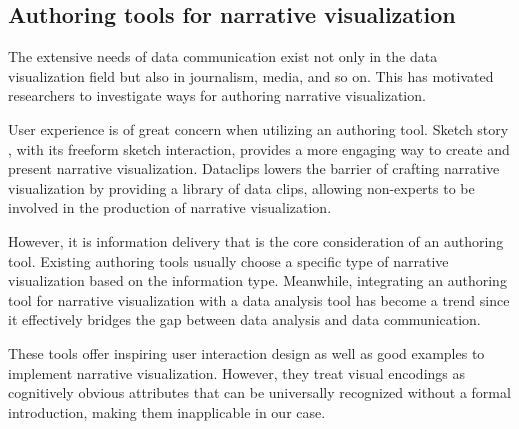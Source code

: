 \documentclass[review,journal]{vgtc}         %
\begin{document}
\subsection{Authoring tools for narrative visualization}
The extensive needs of data communication exist not only in the data visualization field but also in journalism, media, and so on. This has motivated researchers to investigate ways for authoring narrative visualization. \par
User experience is of great concern when utilizing an authoring tool. Sketch story \cite{lee_sketchstory:_2013}, with its freeform sketch interaction, provides a more engaging way to create and present narrative visualization. Dataclips \cite{amini_authoring_2017}lowers the barrier of crafting narrative visualization by providing a library of data clips, allowing non-experts to be involved in the production of narrative visualization. \par
However, it is information delivery that is the core consideration of an authoring tool. Existing authoring tools usually choose a specific type of narrative visualization based on the information type. \cite{amini_authoring_2017}Meanwhile, integrating an authoring tool for narrative visualization with a  data analysis tool has become a trend since it effectively bridges the gap between data analysis and data communication. \cite{eccles_stories_2007,bryan_temporal_2016,lee_more_2015}\par 
These tools offer inspiring user interaction design as well as good examples to implement narrative visualization. However, they treat visual encodings as cognitively obvious attributes that can be universally recognized without a formal introduction, making them inapplicable in our case. \par
\end{document}

